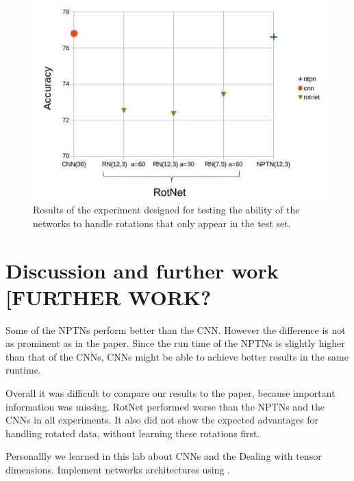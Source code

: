 \documentclass{llncs}
\begin{document}
\begin{figure}
	\begin{center}
	\includegraphics[scale=0.35]{result_images/experiment4.jpg}
	\caption{Results of the experiment designed for testing the ability of the networks to handle rotations that only appear in the test set.}
	\label{pic:experiment4}
	\end{center}
\end{figure}



\section{Discussion and further work [FURTHER WORK?}
Some of the NPTNs perform better than the CNN. However the difference is not as prominent as in the paper. Since the run time of the NPTNs is slightly higher than that of the CNNs, CNNs might be able to achieve better results in the same runtime.

Overall it was difficult to compare our results to the paper, because important information was missing. 
RotNet performed worse than the NPTNs and the CNNs in all experiments.
It also did not show the expected advantages for handling rotated data, without learning these rotations first. 


Personallly we learned in this lab about CNNs and the 
Dealing with tensor dimensions.
Implement networks architectures using \pytorch.

\small
\printbibliography
\end{document}
